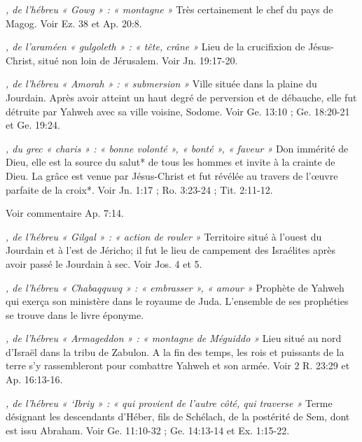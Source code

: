 \begin{multicols}{2}
\textit{, de l'hébreu « Gowg » : « montagne »}\newline
Très certainement le chef du pays de Magog. Voir Ez. 38 et Ap. 20:8.

\textit{, de l'araméen « gulgoleth » : « tête, crâne »}\newline
Lieu de la crucifixion de Jésus-Christ, situé non loin de Jérusalem. Voir Jn. 19:17-20.

\textit{, de l'hébreu « Amorah » : « submersion »}\newline
Ville située dans la plaine du Jourdain. Après avoir atteint un haut degré de perversion et de débauche, elle fut détruite par Yahweh avec sa ville voisine, Sodome. Voir Ge. 13:10 ; Ge. 18:20-21 et Ge. 19:24.

\textit{, du grec « charis » : « bonne volonté », « bonté », « faveur »}\newline
Don immérité de Dieu, elle est la source du salut* de tous les hommes et invite à la crainte de Dieu. La grâce est venue par Jésus-Christ et fut révélée au travers de l'œuvre parfaite de la croix*. Voir Jn. 1:17 ; Ro. 3:23-24 ; Tit. 2:11-12.

\textit{}\newline
Voir commentaire Ap. 7:14.

\textit{, de l'hébreu « Gilgal » : « action de rouler »}\newline
Territoire situé à l'ouest du Jourdain et à l'est de Jéricho; il fut le lieu de campement des Israélites après avoir passé le Jourdain à sec. Voir Jos. 4 et 5.

\textit{, de l'hébreu « Chabaqquwq » : « embrasser », « amour »}\newline
Prophète de Yahweh qui exerça son ministère dans le royaume de Juda. L'ensemble de ses prophéties se trouve dans le livre éponyme.

\textit{, de l'hébreu « Armageddon » : « montagne de Méguiddo »}\newline
Lieu situé au nord d'Israël dans la tribu de Zabulon. A la fin des temps, les rois et puissants de la terre s'y rassembleront pour combattre Yahweh et son armée. Voir 2 R. 23:29 et Ap. 16:13-16.

\textit{, de l'hébreu « `Ibriy » : « qui provient de l'autre côté, qui traverse »}\newline
Terme désignant les descendants d'Héber, fils de Schélach, de la postérité de Sem, dont est issu Abraham. Voir Ge. 11:10-32 ; Ge. 14:13-14 et Ex. 1:15-22.


\end{multicols}
